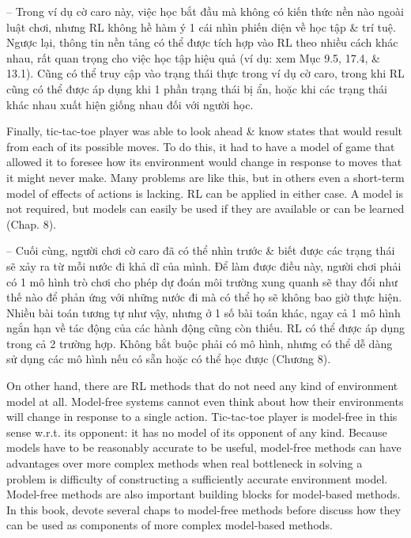 \documentclass{article}
\begin{document}
\begin{itemize}
\begin{itemize}
        -- Trong ví dụ cờ caro này, việc học bắt đầu mà không có kiến thức nền nào ngoài luật chơi, nhưng RL không hề hàm ý 1 cái nhìn phiến diện về học tập \& trí tuệ. Ngược lại, thông tin nền tảng có thể được tích hợp vào RL theo nhiều cách khác nhau, rất quan trọng cho việc học tập hiệu quả (ví dụ: xem Mục 9.5, 17.4, \& 13.1). Cũng có thể truy cập vào trạng thái thực trong ví dụ cờ caro, trong khi RL cũng có thể được áp dụng khi 1 phần trạng thái bị ẩn, hoặc khi các trạng thái khác nhau xuất hiện giống nhau đối với người học.

        Finally, tic-tac-toe player was able to look ahead \& know states that would result from each of its possible moves. To do this, it had to have a model of game that allowed it to foresee how its environment would change in response to moves that it might never make. Many problems are like this, but in others even a short-term model of effects of actions is lacking. RL can be applied in either case. A model is not required, but models can easily be used if they are available or can be learned (Chap. 8).

        -- Cuối cùng, người chơi cờ caro đã có thể nhìn trước \& biết được các trạng thái sẽ xảy ra từ mỗi nước đi khả dĩ của mình. Để làm được điều này, người chơi phải có 1 mô hình trò chơi cho phép dự đoán môi trường xung quanh sẽ thay đổi như thế nào để phản ứng với những nước đi mà có thể họ sẽ không bao giờ thực hiện. Nhiều bài toán tương tự như vậy, nhưng ở 1 số bài toán khác, ngay cả 1 mô hình ngắn hạn về tác động của các hành động cũng còn thiếu. RL có thể được áp dụng trong cả 2 trường hợp. Không bắt buộc phải có mô hình, nhưng có thể dễ dàng sử dụng các mô hình nếu có sẵn hoặc có thể học được (Chương 8).

        On other hand, there are RL methods that do not need any kind of environment model at all. Model-free systems cannot even think about how their environments will change in response to a single action. Tic-tac-toe player is model-free in this sense w.r.t. its opponent: it has no model of its opponent of any kind. Because models have to be reasonably accurate to be useful, model-free methods can have advantages over more complex methods when real bottleneck in solving a problem is difficulty of constructing a sufficiently accurate environment model. Model-free methods are also important building blocks for model-based methods. In this book, devote several chaps to model-free methods before discuss how they can be used as components of more complex model-based methods.


\end{itemize}
\end{itemize}
\end{document}
